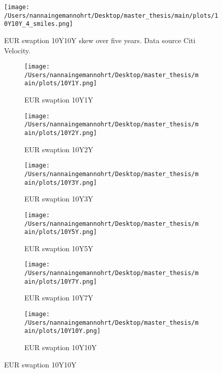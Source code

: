 \begin{figure}[H]
    \centering
    \texttt{[image: /Users/nannaingemannohrt/Desktop/master\_thesis/main/plots/10Y10Y\_4\_smiles.png]}
    \caption{EUR swaption 10Y10Y skew over five years. Data source Citi Velocity.}
    \label{fig:rates:smile_5}
\end{figure}


\begin{figure}[htbp]
    \centering
    \begin{subfigure}{0.43\textwidth}
        \texttt{[image: /Users/nannaingemannohrt/Desktop/master\_thesis/main/plots/10Y1Y.png]}
        \caption{EUR swaption 10Y1Y}
        \label{fig:10Y1Y_}
    \end{subfigure}\hfill
    \begin{subfigure}{0.43
        \textwidth}
        \texttt{[image: /Users/nannaingemannohrt/Desktop/master\_thesis/main/plots/10Y2Y.png]}
        \caption{EUR swaption 10Y2Y}
        \label{fig:10Y2Y_}
    \end{subfigure}
    \begin{subfigure}{0.43\textwidth}
        \texttt{[image: /Users/nannaingemannohrt/Desktop/master\_thesis/main/plots/10Y3Y.png]}
        \caption{EUR swaption 10Y3Y}
        \label{fig:10Y3Y_}
    \end{subfigure}\hfill
    \begin{subfigure}{0.43\textwidth}
        \texttt{[image: /Users/nannaingemannohrt/Desktop/master\_thesis/main/plots/10Y5Y.png]}
        \caption{EUR swaption 10Y5Y}
        \label{fig:10Y5Y_}
    \end{subfigure}
    \begin{subfigure}{0.43\textwidth}
        \texttt{[image: /Users/nannaingemannohrt/Desktop/master\_thesis/main/plots/10Y7Y.png]}
        \caption{EUR swaption 10Y7Y}
        \label{fig:10Y7Y_}
    \end{subfigure}\hfill
    \begin{subfigure}{0.43\textwidth}
        \texttt{[image: /Users/nannaingemannohrt/Desktop/master\_thesis/main/plots/10Y10Y.png]}
        \caption{EUR swaption 10Y10Y}
        \label{fig:10Y10Y_}
    \end{subfigure}


\end{figure}
